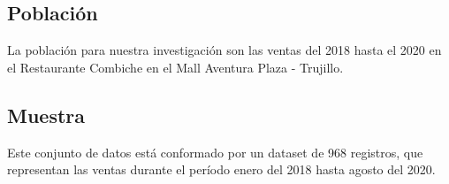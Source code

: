 \subsection{Población}
La población para nuestra investigación son las ventas del 2018 hasta el 2020 en el Restaurante Combiche en el Mall Aventura Plaza - Trujillo.

\subsection{Muestra}
Este conjunto de datos está conformado por un dataset de 968 registros, que representan las ventas durante el período enero del 2018 hasta agosto del 2020.

